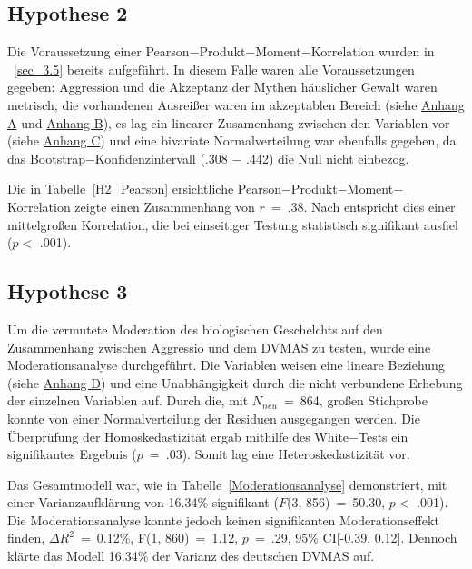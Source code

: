 \subsection{Hypothese 2}    \label{subsec_4.3.2}
Die Voraussetzung einer Pearson$-$Produkt$-$Moment$-$Korrelation wurden in ~\ref{sec_3.5} bereits aufgeführt. In diesem Falle waren alle Voraussetzungen gegeben: Aggression und die Akzeptanz der Mythen häuslicher Gewalt waren metrisch, die vorhandenen Ausreißer waren im akzeptablen Bereich (siehe \hyperref[Boxplot_AggroFB]{Anhang A} und \hyperref[Boxplot_DVMAS]{Anhang B}), 
es lag ein linearer Zusamenhang zwischen den Variablen vor (siehe \hyperref[Linearitat_AggroFB_DVMAS]{Anhang C}) und eine bivariate Normalverteilung war ebenfalls gegeben, da das Bootstrap$-$Konfidenzintervall (.308 $-$ .442) die Null nicht einbezog.

Die in Tabelle~\ref{H2_Pearson} ersichtliche Pearson$-$Produkt$-$Moment$-$Korrelation zeigte einen Zusammenhang von $r$~=~.38. Nach \textcite{Cohen_1992} entspricht dies einer mittelgroßen Korrelation, die bei einseitiger Testung statistisch signifikant ausfiel ($p<$ .001).



\subsection{Hypothese 3}    \label{subsec_4.3.3}
Um die vermutete Moderation des biologischen Geschelchts auf den Zusammenhang zwischen Aggressio und dem DVMAS zu testen, wurde eine Moderationsanalyse durchgeführt. Die Variablen weisen eine lineare Beziehung (siehe \hyperref[Linearitat_sex_DVMAS]{Anhang D}) und eine Unabhängigkeit durch die nicht verbundene Erhebung der einzelnen Variablen auf. Durch die, mit $N_{neu}$~=~864, großen Stichprobe konnte von einer Normalverteilung der Residuen ausgegangen werden. Die Überprüfung der Homoskedastizität ergab mithilfe des White$-$Tests ein signifikantes Ergebnis ($p$~=~.03). Somit lag eine Heteroskedastizität vor. 


Das Gesamtmodell war, wie in Tabelle~\ref{Moderationsanalyse} demonstriert, mit einer Varianzaufklärung von 16.34\% signifikant ($F$(3, 856)~=~50.30, $p<$ .001). Die Moderationsanalyse konnte jedoch keinen signifikanten Moderationseffekt finden, $\Delta R^{2}$~=~0.12\%, F(1, 860)~=~1.12, $p$~=~.29, 95\% CI[-0.39, 0.12]. Dennoch klärte das Modell 16.34\% der Varianz des deutschen DVMAS auf.

